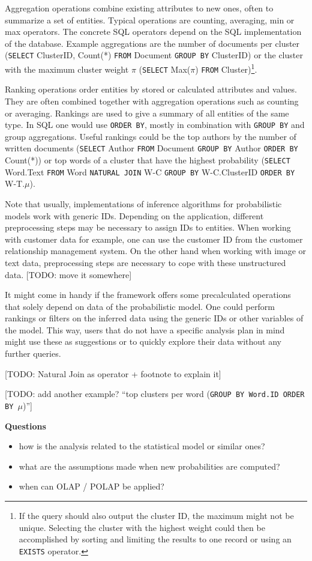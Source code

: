Aggregation operations combine existing attributes to new ones, often to summarize a set of entities. Typical operations are counting, averaging, min or max operators. The concrete SQL operators depend on the SQL implementation of the database. Example aggregations are the number of documents per cluster (\texttt{SELECT} ClusterID, Count(*) \texttt{FROM} Document \texttt{GROUP BY} ClusterID) or the cluster with the maximum cluster weight $\pi$ (\texttt{SELECT} Max($\pi$) \texttt{FROM} Cluster)\footnote{If the query should also output the cluster ID, the maximum might not be unique. Selecting the cluster with the highest weight could then be accomplished by sorting and limiting the results to one record or using an \texttt{EXISTS} operator.}.

Ranking operations order entities by stored or calculated attributes and values. They are often combined together with aggregation operations such as counting or averaging. Rankings are used to give a summary of all entities of the same type. In SQL one would use \texttt{ORDER BY}, mostly in combination with \texttt{GROUP BY} and group aggregations. Useful rankings could be the top authors by the number of written documents (\texttt{SELECT} Author \texttt{FROM} Document \texttt{GROUP BY} Author \texttt{ORDER BY} Count(*)) or top words of a cluster that have the highest probability (\texttt{SELECT} Word.Text \texttt{FROM} Word \texttt{NATURAL JOIN} W-C \texttt{GROUP BY} W-C.ClusterID \texttt{ORDER BY} W-T.$\mu$).

Note that usually, implementations of inference algorithms for probabilistic models work with generic IDs. Depending on the application, different preprocessing steps may be necessary to assign IDs to entities. When working with customer data for example, one can use the customer ID from the customer relationship management system. On the other hand when working with image or text data, preprocessing steps are necessary to cope with these unstructured data. [TODO: move it somewhere]

It might come in handy if the framework offers some precalculated operations that solely depend on data of the probabilistic model. One could perform rankings or filters on the inferred data using the generic IDs or other variables of the model. This way, users that do not have a specific analysis plan in mind might use these as suggestions or to quickly explore their data without any further queries.

[TODO: Natural Join as operator + footnote to explain it]

[TODO: add another example? ``top clusters per word (\texttt{GROUP BY \textrm{Word.ID} ORDER BY $\mu$})'']

\textbf{Questions}
\begin{itemize}
\item how is the analysis related to the statistical model or similar ones?
\item what are the assumptions made when new probabilities are computed?
\item when can OLAP / POLAP be applied?
\end{itemize}
